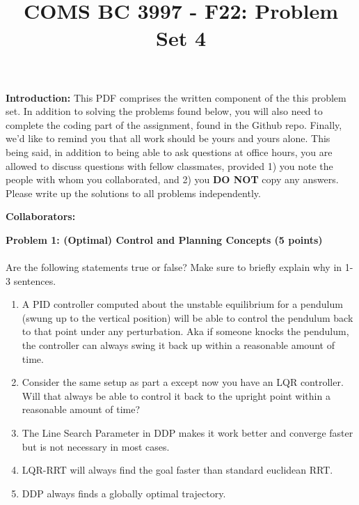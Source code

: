 \documentclass[]{article}
\title{COMS BC 3997 - F22: Problem Set 4}
\author{
}
\date{}
\begin{document}
\maketitle %

\textbf{Introduction:}  
This PDF comprises the written component of the this problem set.  In addition to solving the problems found below, you will also need to complete the coding part of the assignment, found in the Github repo. Finally, we'd like to remind you that all work should be yours and yours alone. This being said, in addition to being able to ask questions at office hours, you are allowed to discuss questions with fellow classmates, provided 1) you note the people with whom you collaborated, and 2) you \textbf{DO NOT} copy any answers. Please write up the solutions to all problems independently.

\bigskip
\textbf{Collaborators:}

\clearpage
\textbf{Problem 1: (Optimal) Control and Planning Concepts (5 points)}\\
\\Are the following statements true or false? Make sure to briefly explain why in 1-3 sentences.
\begin{enumerate}[label=(\alph*)]
    \item A PID controller computed about the unstable equilibrium for a pendulum (swung up to the vertical position) will be able to control the pendulum back to that point under any perturbation. Aka if someone knocks the pendulum, the controller can always swing it back up within a reasonable amount of time.
    \item Consider the same setup as part a except now you have an LQR controller. Will that always be able to control it back to the upright point within a reasonable amount of time?
    \item The Line Search Parameter in DDP makes it work better and converge faster but is not necessary in most cases.
    \item LQR-RRT will always find the goal faster than standard euclidean RRT.
    \item DDP always finds a globally optimal trajectory.
\end{enumerate}
\end{document}
